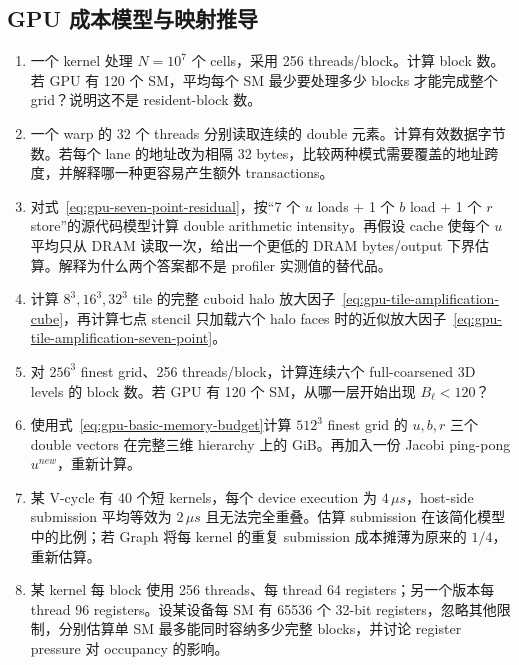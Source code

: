 \subsection*{GPU 成本模型与映射推导}
\begin{enumerate}[label=\arabic*.]
\item 一个 kernel 处理 $N=10^7$ 个 cells，采用 256 threads/block。计算 block 数。若 GPU 有 120 个 SM，平均每个 SM 最少要处理多少 blocks 才能完成整个 grid？说明这不是 resident-block 数。
\item 一个 warp 的 32 个 threads 分别读取连续的 double 元素。计算有效数据字节数。若每个 lane 的地址改为相隔 32 bytes，比较两种模式需要覆盖的地址跨度，并解释哪一种更容易产生额外 transactions。
\item 对式~\eqref{eq:gpu-seven-point-residual}，按“7 个 $u$ loads + 1 个 $b$ load + 1 个 $r$ store”的源代码模型计算 double arithmetic intensity。再假设 cache 使每个 $u$ 平均只从 DRAM 读取一次，给出一个更低的 DRAM bytes/output 下界估算。解释为什么两个答案都不是 profiler 实测值的替代品。
\item 计算 $8^3,16^3,32^3$ tile 的完整 cuboid halo 放大因子~\eqref{eq:gpu-tile-amplification-cube}，再计算七点 stencil 只加载六个 halo faces 时的近似放大因子~\eqref{eq:gpu-tile-amplification-seven-point}。
\item 对 $256^3$ finest grid、256 threads/block，计算连续六个 full-coarsened 3D levels 的 block 数。若 GPU 有 120 个 SM，从哪一层开始出现 $B_\ell<120$？
\item 使用式~\eqref{eq:gpu-basic-memory-budget}计算 $512^3$ finest grid 的 $u,b,r$ 三个 double vectors 在完整三维 hierarchy 上的 GiB。再加入一份 Jacobi ping-pong $u^{new}$，重新计算。
\item 某 V-cycle 有 40 个短 kernels，每个 device execution 为 $4\,\mu s$，host-side submission 平均等效为 $2\,\mu s$ 且无法完全重叠。估算 submission 在该简化模型中的比例；若 Graph 将每 kernel 的重复 submission 成本摊薄为原来的 $1/4$，重新估算。
\item 某 kernel 每 block 使用 256 threads、每 thread 64 registers；另一个版本每 thread 96 registers。设某设备每 SM 有 65536 个 32-bit registers，忽略其他限制，分别估算单 SM 最多能同时容纳多少完整 blocks，并讨论 register pressure 对 occupancy 的影响。


\end{enumerate}

